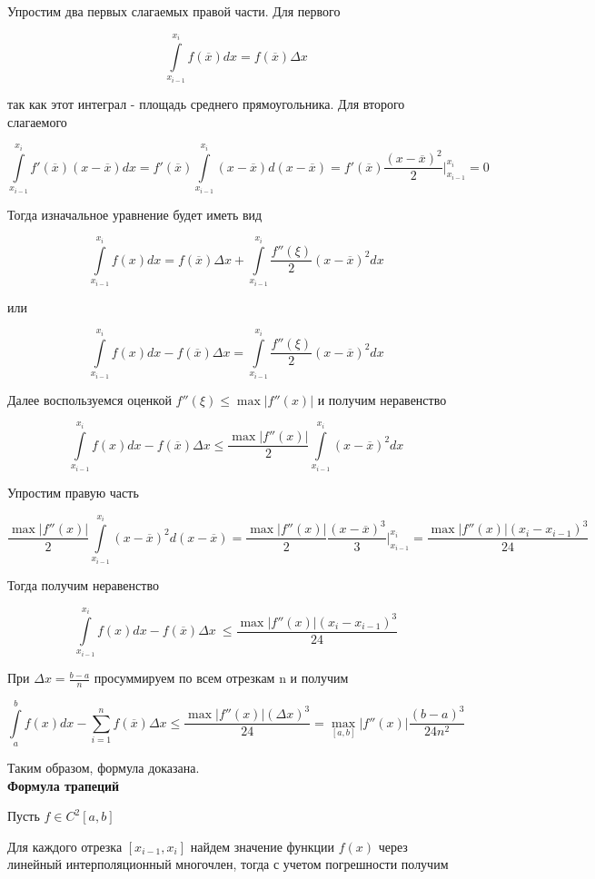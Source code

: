 \documentclass[12pt, a4paper]{report}
\begin{document}
	Упростим два первых слагаемых правой части. Для первого
	
	\[ \int\limits_{x_{i-1}}^{x_i} f(\overline{x})dx = f(\overline{x}) \Delta x\]
	
	так как этот интеграл - площадь среднего прямоугольника. Для второго слагаемого
	
	\[ \int\limits_{x_{i-1}}^{x_i} f'(\overline{x})(x - \overline{x})dx = f'(\overline{x})  \int\limits_{x_{i-1}}^{x_i} (x - \overline{x})d(x - \overline{x}) = f'(\overline{x}) \frac{(x - \overline{x})^2}{2} \Bigg|_{x_{i-1}}^{x_i} = 0 \]
	
	Тогда изначальное уравнение будет иметь вид 
	
	\[ \int\limits_{x_{i-1}}^{x_i} f(x)dx =  f(\overline{x}) \Delta x + \int\limits_{x_{i-1}}^{x_i} \frac{f''(\xi)}{2} (x - \overline{x})^2 dx\]
	
	или
	
	\[ \int\limits_{x_{i-1}}^{x_i} f(x)dx - f(\overline{x}) \Delta x = \int\limits_{x_{i-1}}^{x_i} \frac{f''(\xi)}{2} (x - \overline{x})^2 dx\]
	
	Далее воспользуемся оценкой $f''(\xi) \leq \max|f''(x)|$ и получим неравенство
	
	\[ \int\limits_{x_{i-1}}^{x_i} f(x)dx - f(\overline{x}) \Delta x \leq \frac{\max|f''(x)|}{2} \int\limits_{x_{i-1}}^{x_i} (x - \overline{x})^2 dx\]
	
	Упростим правую часть
	
	\[ \frac{\max|f''(x)|}{2} \int\limits_{x_{i-1}}^{x_i} (x - \overline{x})^2 d(x - \overline{x}) = \frac{\max|f''(x)|}{2} \frac{(x - \overline{x})^3}{3} \Bigg|_{x_{i-1}}^{x_i} = \frac{\max|f''(x)|(x_i - x_{i-1})^3}{24}\]
	
	Тогда получим неравенство
	
	\[ \int\limits_{x_{i-1}}^{x_i} f(x)dx - f(\overline{x}) \Delta x\ \leq \frac{\max|f''(x)|(x_i - x_{i-1})^3}{24}\]
	
	При $\Delta x = \frac{b-a}{n}$ просуммируем по всем отрезкам n и получим
	
	\[ \int\limits_{a}^{b} f(x)dx - \sum_{i=1}^{n} f(\overline{x}) \Delta x \leq \frac{\max|f''(x)|(\Delta x)^3}{24} = \max_{[a, b]}|f''(x)| \frac{(b - a)^3}{24n^2} \]
	
	Таким образом, формула доказана. \\
	
	\textbf{Формула трапеций}
	
	Пусть $f \in C^2[a, b]$
	
	Для каждого отрезка $[x_{i-1}, x_i]$ найдем значение функции $f(x)$ через линейный интерполяционный многочлен, тогда с учетом погрешности получим
	
\end{document}
